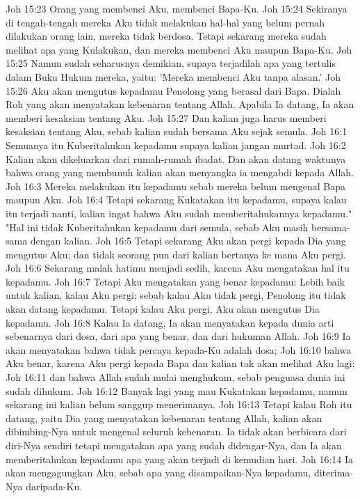 Joh 15:23  Orang yang membenci Aku, membenci Bapa-Ku.
Joh 15:24  Sekiranya di tengah-tengah mereka Aku tidak melakukan hal-hal yang belum pernah dilakukan orang lain, mereka tidak berdosa. Tetapi sekarang mereka sudah melihat apa yang Kulakukan, dan mereka membenci Aku maupun Bapa-Ku.
Joh 15:25  Namun sudah seharusnya demikian, supaya terjadilah apa yang tertulis dalam Buku Hukum mereka, yaitu: 'Mereka membenci Aku tanpa alasan.'
Joh 15:26  Aku akan mengutus kepadamu Penolong yang berasal dari Bapa. Dialah Roh yang akan menyatakan kebenaran tentang Allah. Apabila Ia datang, Ia akan memberi kesaksian tentang Aku.
Joh 15:27  Dan kalian juga harus memberi kesaksian tentang Aku, sebab kalian sudah bersama Aku sejak semula.
Joh 16:1  Semuanya itu Kuberitahukan kepadamu supaya kalian jangan murtad.
Joh 16:2  Kalian akan dikeluarkan dari rumah-rumah ibadat. Dan akan datang waktunya bahwa orang yang membunuh kalian akan menyangka ia mengabdi kepada Allah.
Joh 16:3  Mereka melakukan itu kepadamu sebab mereka belum mengenal Bapa maupun Aku.
Joh 16:4  Tetapi sekarang Kukatakan itu kepadamu, supaya kalau itu terjadi nanti, kalian ingat bahwa Aku sudah memberitahukannya kepadamu." "Hal ini tidak Kuberitahukan kepadamu dari semula, sebab Aku masih bersama-sama dengan kalian.
Joh 16:5  Tetapi sekarang Aku akan pergi kepada Dia yang mengutus Aku; dan tidak seorang pun dari kalian bertanya ke mana Aku pergi.
Joh 16:6  Sekarang malah hatimu menjadi sedih, karena Aku mengatakan hal itu kepadamu.
Joh 16:7  Tetapi Aku mengatakan yang benar kepadamu: Lebih baik untuk kalian, kalau Aku pergi; sebab kalau Aku tidak pergi, Penolong itu tidak akan datang kepadamu. Tetapi kalau Aku pergi, Aku akan mengutus Dia kepadamu.
Joh 16:8  Kalau Ia datang, Ia akan menyatakan kepada dunia arti sebenarnya dari dosa, dari apa yang benar, dan dari hukuman Allah.
Joh 16:9  Ia akan menyatakan bahwa tidak percaya kepada-Ku adalah dosa;
Joh 16:10  bahwa Aku benar, karena Aku pergi kepada Bapa dan kalian tak akan melihat Aku lagi;
Joh 16:11  dan bahwa Allah sudah mulai menghukum, sebab penguasa dunia ini sudah dihukum.
Joh 16:12  Banyak lagi yang mau Kukatakan kepadamu, namun sekarang ini kalian belum sanggup menerimanya.
Joh 16:13  Tetapi kalau Roh itu datang, yaitu Dia yang menyatakan kebenaran tentang Allah, kalian akan dibimbing-Nya untuk mengenal seluruh kebenaran. Ia tidak akan berbicara dari diri-Nya sendiri tetapi mengatakan apa yang sudah didengar-Nya, dan Ia akan memberitahukan kepadamu apa yang akan terjadi di kemudian hari.
Joh 16:14  Ia akan mengagungkan Aku, sebab apa yang disampaikan-Nya kepadamu, diterima-Nya daripada-Ku.
